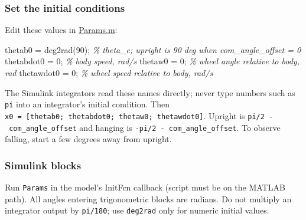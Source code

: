\documentclass[
]{article}
\newenvironment{Shaded}{}{}
\newcommand{\CommentTok}[1]{\textcolor[rgb]{0.38,0.63,0.69}{\textit{#1}}}
\newcommand{\FloatTok}[1]{\textcolor[rgb]{0.25,0.63,0.44}{#1}}
\newcommand{\NormalTok}[1]{#1}
\newcommand{\OperatorTok}[1]{\textcolor[rgb]{0.40,0.40,0.40}{#1}}
\newcommand{\VariableTok}[1]{\textcolor[rgb]{0.10,0.09,0.49}{#1}}
\begin{document}
\subsubsection{Set the initial
conditions}\label{set-the-initial-conditions}

Edit these values in \href{Matlab\%20sim/Params.m}{Params.m}:

\begin{Shaded}
\begin{Highlighting}[]
\VariableTok{thetab0} \OperatorTok{=} \VariableTok{deg2rad}\NormalTok{(}\FloatTok{90}\NormalTok{)}\OperatorTok{;} \CommentTok{\% theta\_c; upright is 90 deg when com\_angle\_offset = 0}
\VariableTok{thetabdot0} \OperatorTok{=} \FloatTok{0}\OperatorTok{;}        \CommentTok{\% body speed, rad/s}
\VariableTok{thetaw0} \OperatorTok{=} \FloatTok{0}\OperatorTok{;}           \CommentTok{\% wheel angle relative to body, rad}
\VariableTok{thetawdot0} \OperatorTok{=} \FloatTok{0}\OperatorTok{;}        \CommentTok{\% wheel speed relative to body, rad/s}
\end{Highlighting}
\end{Shaded}

The Simulink integrators read these names directly; never type numbers
such as \texttt{pi} into an integrator's initial condition. Then
\texttt{x0\ =\ {[}thetab0;\ thetabdot0;\ thetaw0;\ thetawdot0{]}}.
Upright is \texttt{pi/2\ -\ com\_angle\_offset} and hanging is
\texttt{-pi/2\ -\ com\_angle\_offset}. To observe falling, start a few
degrees away from upright.

\subsubsection{Simulink blocks}\label{simulink-blocks}

Run \texttt{Params} in the model's InitFcn callback (script must be on
the MATLAB path). All angles entering trigonometric blocks are radians.
Do not multiply an integrator output by \texttt{pi/180}; use
\texttt{deg2rad} only for numeric initial values.
\end{document}
